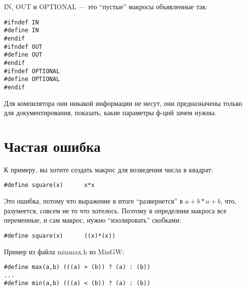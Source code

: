 IN, OUT и OPTIONAL --- это ``пустые'' макросы объявленные так:

\begin{lstlisting}
#ifndef IN
#define IN
#endif
#ifndef OUT
#define OUT
#endif
#ifndef OPTIONAL
#define OPTIONAL
#endif
\end{lstlisting}

Для компилятора они никакой информации не несут, они предназначены только для документирования, показать,
какие параметры ф-ций зачем нужны.

\section{Частая ошибка}

К примеру, вы хотите создать макрос для возведения числа в квадрат:

\begin{lstlisting}
#define square(x)      x*x
\end{lstlisting}

Это ошибка, потому что выражение  в итоге ``развернется'' в $a+b*a+b$, что, разумеется, совсем
не то что хотелось. Поэтому в определнии макроса все переменные, и сам макрос, нужно ``изолировать'' скобками:

\begin{lstlisting}
#define square(x)      ((x)*(x))
\end{lstlisting}

Пример из файла minmax.h из MinGW:

\begin{lstlisting}
#define max(a,b) (((a) > (b)) ? (a) : (b))
...
#define min(a,b) (((a) < (b)) ? (a) : (b))
\end{lstlisting}


